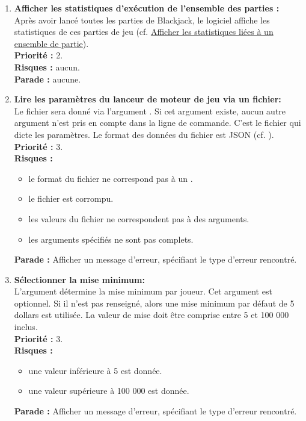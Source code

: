 \begin{enumerate}
    \item \textbf{Afficher les statistiques d'exécution de l'ensemble des parties :} \\
    Après avoir lancé toutes les parties de Blackjack, le logiciel affiche les statistiques de ces parties de jeu (cf. \hyperref[itm:stats]{Afficher les statistiques liées à un ensemble de partie}). \\
    \textbf{Priorité :} 2. \\
    \textbf{Risques :} aucun. \\
    \textbf{Parade :} aucune.

    \item \textbf{Lire les paramètres du lanceur de moteur de jeu via un fichier:}\\
    Le fichier sera donné via l'argument . Si cet argument existe, aucun autre argument n'est pris en compte dans la ligne de commande. C'est le fichier qui dicte les paramètres. Le format des données du fichier est JSON (cf. ). \\
    \textbf{Priorité :} 3. \\
    \textbf{Risques :}
    \begin{itemize}
        \item le format du fichier ne correspond pas à un .
        \item le fichier est corrompu.
        \item les valeurs du fichier ne correspondent pas à des arguments.
        \item les arguments spécifiés ne sont pas complets.
    \end{itemize}
    \textbf{Parade :} Afficher un message d'erreur, spécifiant le type d'erreur rencontré.

    \item \textbf{Sélectionner la mise minimum:}\\
    L'argument  détermine la mise minimum par joueur. Cet argument est optionnel. Si il n'est pas renseigné, alors une mise minimum par défaut de 5 dollars est utilisée. La valeur de mise doit être comprise entre 5 et 100 000 inclus. \\
    \textbf{Priorité :} 3. \\
    \textbf{Risques :}
    \begin{itemize}
        \item une valeur inférieure à 5 est donnée.
        \item une valeur supérieure à 100 000 est donnée.
    \end{itemize}
    \textbf{Parade :} Afficher un message d'erreur, spécifiant le type d'erreur rencontré.
    

\end{enumerate}
